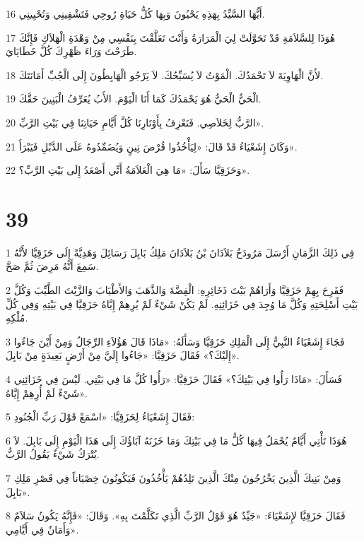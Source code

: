 \par 16 أَيُّهَا السَّيِّدُ بِهَذِهِ يَحْيُونَ وَبِهَا كُلُّ حَيَاةِ رُوحِي فَتَشْفِينِي وَتُحْيِينِي.
\par 17 هُوَذَا لِلسَّلاَمَةِ قَدْ تَحَوَّلَتْ لِيَ الْمَرَارَةُ وَأَنْتَ تَعَلَّقْتَ بِنَفْسِي مِنْ وَهْدَةِ الْهَلاَكِ فَإِنَّكَ طَرَحْتَ وَرَاءَ ظَهْرِكَ كُلَّ خَطَايَايَ.
\par 18 لأَنَّ الْهَاوِيَةَ لاَ تَحْمَدُكَ. الْمَوْتُ لاَ يُسَبِّحُكَ. لاَ يَرْجُو الْهَابِطُونَ إِلَى الْجُبِّ أَمَانَتَكَ.
\par 19 الْحَيُّ الْحَيُّ هُوَ يَحْمَدُكَ كَمَا أَنَا الْيَوْمَ. الأَبُ يُعَرِّفُ الْبَنِينَ حَقَّكَ.
\par 20 الرَّبُّ لِخَلاَصِي. فَنَعْزِفُ بِأَوْتَارِنَا كُلَّ أَيَّامِ حَيَاتِنَا فِي بَيْتِ الرَّبِّ».
\par 21 وَكَانَ إِشَعْيَاءُ قَدْ قَالَ: «لِيَأْخُذُوا قُرْصَ تِينٍ وَيُضَمِّدُوهُ عَلَى الدَّبْلِ فَيَبْرَأَ».
\par 22 وَحَزَقِيَّا سَأَلَ: «مَا هِيَ الْعَلاَمَةُ أَنِّي أَصْعَدُ إِلَى بَيْتِ الرَّبِّ؟».

\chapter{39}

\par 1 فِي ذَلِكَ الزَّمَانِ أَرْسَلَ مَرُودَخُ بَلاَدَانَ بْنُ بَلاَدَانَ مَلِكُ بَابِلَ رَسَائِلَ وَهَدِيَّةً إِلَى حَزَقِيَّا لأَنَّهُ سَمِعَ أَنَّهُ مَرِضَ ثُمَّ صَحَّ.
\par 2 فَفَرِحَ بِهِمْ حَزَقِيَّا وَأَرَاهُمْ بَيْتَ ذَخَائِرِهِ: الْفِضَّةَ وَالذَّهَبَ وَالأَطْيَابَ وَالزَّيْتَ الطَّيِّبَ وَكُلَّ بَيْتِ أَسْلِحَتِهِ وَكُلَّ مَا وُجِدَ فِي خَزَائِنِهِ. لَمْ يَكُنْ شَيْءٌ لَمْ يُرِهِمْ إِيَّاهُ حَزَقِيَّا فِي بَيْتِهِ وَفِي كُلِّ مُلْكِهِ.
\par 3 فَجَاءَ إِشَعْيَاءُ النَّبِيُّ إِلَى الْمَلِكِ حَزَقِيَّا وَسَأَلَهُ: «مَاذَا قَالَ هَؤُلاَءِ الرِّجَالُ وَمِنْ أَيْنَ جَاءُوا إِلَيْكَ؟» فَقَالَ حَزَقِيَّا: «جَاءُوا إِلَيَّ مِنْ أَرْضٍ بَعِيدَةٍ مِنْ بَابِلَ».
\par 4 فَسَأَلَ: «مَاذَا رَأُوا فِي بَيْتِكَ؟» فَقَالَ حَزَقِيَّا: «رَأُوا كُلَّ مَا فِي بَيْتِي. لَيْسَ فِي خَزَائِنِي شَيْءٌ لَمْ أُرِهِمْ إِيَّاهُ».
\par 5 فَقَالَ إِشَعْيَاءُ لِحَزَقِيَّا: «اسْمَعْ قَوْلَ رَبِّ الْجُنُودِ:
\par 6 هُوَذَا تَأْتِي أَيَّامٌ يُحْمَلُ فِيهَا كُلُّ مَا فِي بَيْتِكَ وَمَا خَزَنَهُ آبَاؤُكَ إِلَى هَذَا الْيَوْمِ إِلَى بَابِلَ. لاَ يُتْرَكُ شَيْءٌ يَقُولُ الرَّبُّ.
\par 7 وَمِنْ بَنِيكَ الَّذِينَ يَخْرُجُونَ مِنْكَ الَّذِينَ تَلِدُهُمْ يَأْخُذُونَ فَيَكُونُونَ خِصْيَاناً فِي قَصْرِ مَلِكِ بَابِلَ».
\par 8 فَقَالَ حَزَقِيَّا لإِشَعْيَاءَ: «جَيِّدٌ هُوَ قَوْلُ الرَّبِّ الَّذِي تَكَلَّمْتَ بِهِ». وَقَالَ: «فَإِنَّهُ يَكُونُ سَلاَمٌ وَأَمَانٌ فِي أَيَّامِي».

